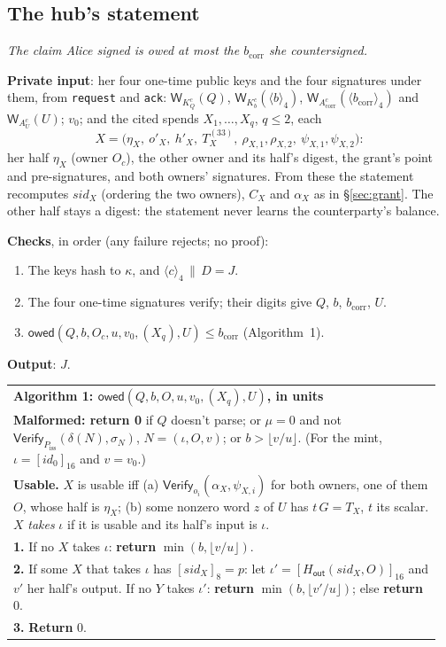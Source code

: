 \documentclass[11pt]{article}
\theoremstyle{plain}
\theoremstyle{definition}
\newcommand{\bcorr}{b_{\mathrm{corr}}}
\newcommand{\tx}[1]{\texttt{#1}}
\newcommand{\be}[2]{\langle #1\rangle_{#2}}
\newcommand{\pre}[2]{[#1]_{#2}}
\newcommand{\Ht}[1]{H_{\textsf{#1}}}
\newcommand{\Vfy}{\mathsf{Verify}}
\newcommand{\Wots}{\mathsf{W}}
\newcommand{\Piss}{P_{\mathrm{iss}}}
\newcommand{\sid}{\mathit{sid}}
\newcommand{\owed}{\mathsf{owed}}
\newcommand{\Oc}{O_c}
\newcommand{\KQ}{K_{Q}^{c}}
\newcommand{\Kb}{K_{b}^{c}}
\newcommand{\Acorr}{A_{\mathrm{corr}}^{c}}
\newcommand{\AU}{A_{U}^{c}}
\newenvironment{algobox}[1]
  {\par\smallskip\noindent\begin{tabular}{|p{0.955\linewidth}|}\hline\textbf{#1}\\[2pt]}
  {\\\hline\end{tabular}\par\smallskip}
\begin{document}
\subsection{The hub's statement}\label{sec:statement}

\emph{The claim Alice signed is owed at most the $\bcorr$ she
countersigned.}

\textbf{Private input}: her four one-time public keys and the four
signatures under them, from \tx{request} and \tx{ack}: $\Wots_{\KQ}(Q)$,
$\Wots_{\Kb}(\be{b}{4})$, $\Wots_{\Acorr}(\be{\bcorr}{4})$ and
$\Wots_{\AU}(U)$; $v_0$; and the cited spends $X_1, \dots, X_q$, $q \le
2$, each
\[
  X = \big(\eta_X,\ o'_X,\ h'_X,\ T_X^{(33)},\ \rho_{X,1}, \rho_{X,2},\
  \psi_{X,1}, \psi_{X,2}\big):
\]
her half $\eta_X$ (owner $\Oc$), the other owner and its half's digest,
the grant's point and pre-signatures, and both owners' signatures. From
these the statement recomputes $\sid_X$ (ordering the two owners),
$C_X$ and $\alpha_X$ as in \S\ref{sec:grant}. The other half stays a
digest: the statement never learns the counterparty's balance.

\textbf{Checks}, in order (any failure rejects; no proof):
\begin{enumerate}[nosep]
\item The keys hash to $\kappa$, and $\be{c}{4} \,\|\, D = J$.
\item The four one-time signatures verify; their digits give $Q$, $b$,
  $\bcorr$, $U$.
\item $\owed(Q, b, \Oc, u, v_0, (X_q), U) \le \bcorr$ (Algorithm~1).
\end{enumerate}
\textbf{Output}: $J$.

\begin{algobox}{Algorithm 1: $\owed(Q, b, O, u, v_0, (X_q), U)$, in units}
\textbf{Malformed: return 0} if $Q$ doesn't parse; or $\mu = 0$ and not
$\Vfy_{\Piss}(\delta(N), \sigma_N)$, $N = (\iota, O, v)$; or $b > \lfloor
v/u \rfloor$. (For the mint, $\iota = \pre{\mathit{id}_0}{16}$ and $v =
v_0$.)\\[3pt]
\textbf{Usable.} $X$ is usable iff (a) $\Vfy_{o_i}(\alpha_X,
\psi_{X,i})$ for both owners, one of them $O$, whose half is
$\eta_X$; (b) some nonzero word $z$ of $U$ has
$t\,G = T_X$, $t$ its scalar. $X$ \emph{takes} $\iota$ if it is usable
and its half's input is $\iota$.\\[3pt]
\textbf{1.} If no $X$ takes $\iota$: \textbf{return} $\min(b, \lfloor
v/u \rfloor)$.\\
\textbf{2.} If some $X$ that takes $\iota$ has $\pre{\sid_X}{8} = p$:
let $\iota' = \pre{\Ht{out}(\sid_X, O)}{16}$ and $v'$ her half's output.
If no $Y$ takes $\iota'$: \textbf{return} $\min(b, \lfloor v'/u
\rfloor)$; else \textbf{return} 0.\\
\textbf{3.} \textbf{Return} 0.
\end{algobox}
\end{document}
